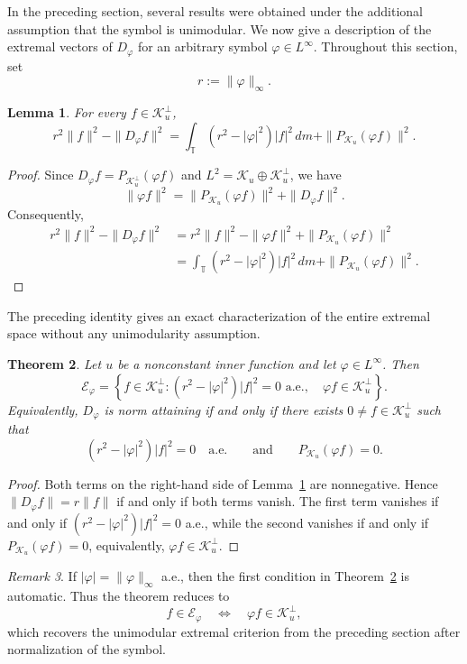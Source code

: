 \documentclass[12pt]{amsart}
\newtheorem{theorem}{Theorem}[section]
\newtheorem{lemma}[theorem]{Lemma}
\theoremstyle{definition}
\theoremstyle{remark}
\newtheorem{remark}[theorem]{Remark}
\def \T{\mathbb{T}}
\newcommand{\cle}{\mathcal{E}}
\newcommand{\clk}{\mathcal{K}}
\newcommand{\vp}{\varphi}
\numberwithin{equation}{section}
\begin{document}
In the preceding section, several results were obtained under the
additional assumption that the symbol is unimodular. We now give a
description of the extremal vectors of $D_\vp$ for an arbitrary symbol $\vp\in L^\infty$. Throughout this section, set
\[
r:=\|\vp\|_\infty.
\]

\begin{lemma} \label{lem:exact-norm-defect}
For every $f\in\clk_u^\perp$,
\[
r^2\|f\|^2-\|D_\vp f\|^2=\int_{\T}(r^2-|\vp|^2)|f|^2\,dm
+\|P_{\clk_u}(\vp f)\|^2.
\]
\end{lemma}

\begin{proof}
Since $D_\vp f=P_{\clk_u^\perp}(\vp f)$ and $L^2=\clk_u\oplus\clk_u^\perp$, we have
\[
\|\vp f\|^2=\|P_{\clk_u}(\vp f)\|^2+\|D_\vp f\|^2.
\]
Consequently,
\[
\begin{aligned}
r^2\|f\|^2-\|D_\vp f\|^2
&=r^2\|f\|^2-\|\vp f\|^2+\|P_{\clk_u}(\vp f)\|^2\\
&=\int_{\T}(r^2-|\vp|^2)|f|^2\,dm +\|P_{\clk_u}(\vp f)\|^2.
\end{aligned}
\]
\end{proof}

The preceding identity gives an exact characterization of the entire
extremal space without any unimodularity assumption.

\begin{theorem}\label{thm:general-extremal-characterization}
Let $u$ be a nonconstant inner function and let $\vp\in L^\infty$.
Then
\[
\cle_\vp=\left\{f\in\clk_u^\perp:(r^2-|\vp|^2)|f|^2=0 \text{ a.e.},
	\quad\vp f\in\clk_u^\perp\right\}.
\]
Equivalently, $D_\vp$ is norm attaining if and only if there exists
$0\neq f\in\clk_u^\perp$ such that
\[
(r^2-|\vp|^2)|f|^2=0\quad\text{a.e.}\qquad\text{and}\qquad
P_{\clk_u}(\vp f)=0.
\]
\end{theorem}

\begin{proof}
Both terms on the right-hand side of Lemma~\ref{lem:exact-norm-defect} are nonnegative. Hence
$\|D_\vp f\|=r\|f\|$ if and only if both terms vanish. The first term vanishes if and only if $(r^2-|\vp|^2)|f|^2=0$ a.e., while the second vanishes if and only if $P_{\clk_u}(\vp f)=0$, equivalently,
$\vp f\in\clk_u^\perp$.
\end{proof}

\begin{remark}
If $|\vp|=\|\vp\|_\infty$ a.e., then the first condition in
Theorem~\ref{thm:general-extremal-characterization} is automatic.
Thus the theorem reduces to
\[
f\in\cle_\vp\quad\Longleftrightarrow\quad \vp f\in\clk_u^\perp,
\]
which recovers the unimodular extremal criterion from the preceding
section after normalization of the symbol.
\end{remark}
\end{document}
